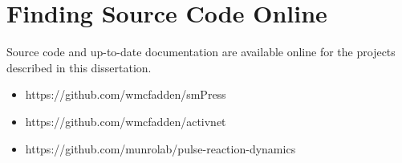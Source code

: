 \section{Finding Source Code Online}

Source code and up-to-date documentation are available online for the projects described in this dissertation.  

\begin{itemize}

\item https://github.com/wmcfadden/smPress
\item https://github.com/wmcfadden/activnet
\item https://github.com/munrolab/pulse-reaction-dynamics

\end{itemize}


%
%
%
%
%
%
%
%
%
%
%



